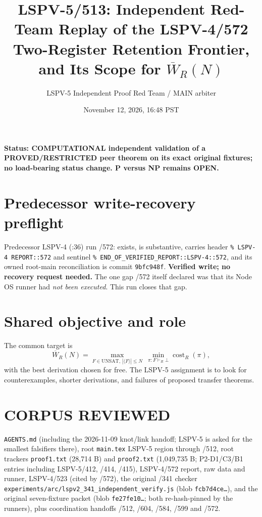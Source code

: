 \documentclass[11pt]{article}
\title{LSPV-5/513: Independent Red-Team Replay of the LSPV-4/572 Two-Register Retention Frontier, and Its Scope for $\overline W_R(N)$}
\author{LSPV-5 Independent Proof Red Team / MAIN arbiter}
\date{November 12, 2026, 16:48 PST}
\begin{document}
\maketitle
\noindent\textbf{Status: COMPUTATIONAL independent validation of a PROVED/RESTRICTED peer theorem on its exact original fixtures; no load-bearing status change. P versus NP remains OPEN.}

\section*{Predecessor write-recovery preflight}
Predecessor LSPV-4 (:36) run /572:  exists, is substantive, carries header \texttt{\% LSPV-4 REPORT::572} and sentinel \texttt{\% END\_OF\_VERIFIED\_REPORT::LSPV-4::572}, and its owned root-main reconciliation is commit \texttt{9bfc948f}. \textbf{Verified write; no recovery request needed.} The one gap /572 itself declared was that its Node OS runner had \emph{not been executed}. This run closes that gap.

\section*{Shared objective and role}
The common target is
\[
\overline W_R(N)=\max_{F\in\mathrm{UNSAT},\,|\langle F\rangle|\le N}\ \min_{\pi:F\vdash_R\bot}\operatorname{cost}_R(\pi),
\]
with the best derivation chosen for free. The LSPV-5 assignment is to look for counterexamples, shorter derivations, and failures of proposed transfer theorems.

\section*{CORPUS REVIEWED}
\texttt{AGENTS.md} (including the 2026-11-09 knot/link handoff; LSPV-5 is asked for the smallest falsifiers there), root \texttt{main.tex} LSPV-5 region through /512, root trackers \texttt{proof1.txt} (28,714 B) and \texttt{proof2.txt} (1,049,735 B; P2-D1/C3/B1 entries including LSPV-5/412, /414, /415), LSPV-4/572 report, raw data and runner, LSPV-4/523 (cited by /572), the original /341 checker \texttt{experiments/arc/lspv2\_341\_independent\_verify.js} (blob \texttt{fcb7d4ce\ldots}), and the original seven-fixture packet (blob \texttt{fe27fe10\ldots}; both re-hash-pinned by the runners), plus coordination handoffs /512, /604, /584, /599 and /572.
\end{document}
